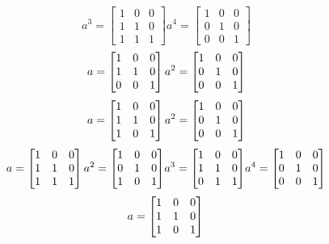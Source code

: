 \begin{mdframed}[style=darkAnswer,frametitle={Joe Starr}]
\begin{itemize}
{$$    a^{ 3 }={ \begin{bmatrix}1&0&0\\1&1&0\\1&1&1\end{bmatrix} }
    a^{ 4 }={ \begin{bmatrix}1&0&0\\0&1&0\\0&0&1\end{bmatrix} }
    $$
    $$a= \begin{bmatrix}1&0&0\\1&1&0\\0&0&1\end{bmatrix} \\
    a^{ 2 }={ \begin{bmatrix}1&0&0\\0&1&0\\0&0&1\end{bmatrix} }
    $$
    $$a= \begin{bmatrix}1&0&0\\1&1&0\\1&0&1\end{bmatrix} \\
    a^{ 2 }={ \begin{bmatrix}1&0&0\\0&1&0\\0&0&1\end{bmatrix} }
    $$
    $$a= \begin{bmatrix}1&0&0\\1&1&0\\1&1&1\end{bmatrix} \\
    a^{ 2 }={ \begin{bmatrix}1&0&0\\0&1&0\\1&0&1\end{bmatrix} }
    a^{ 3 }={ \begin{bmatrix}1&0&0\\1&1&0\\0&1&1\end{bmatrix} }
    a^{ 4 }={ \begin{bmatrix}1&0&0\\0&1&0\\0&0&1\end{bmatrix} }
    $$
    $$a= \begin{bmatrix}1&0&0\\1&1&0\\1&0&1\end{bmatrix} \\
$$}
\end{itemize}
\end{mdframed}

